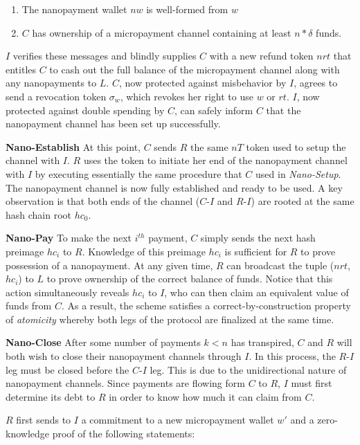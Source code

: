 \begin{enumerate}
\item The nanopayment wallet $nw$ is well-formed from $w$
\item $C$ has ownership of a micropayment channel containing at least $n *
  \delta$ funds.
\end{enumerate}

$I$ verifies these messages and blindly supplies $C$ with a new refund token
$nrt$ that entitles $C$ to cash out the full balance of the micropayment channel
along with any nanopayments to $L$. $C$, now protected against misbehavior by
$I$, agrees to send a revocation token $\sigma_w$, which revokes her right to
use $w$ or $rt$. $I$, now protected against double spending by $C$, can safely
inform $C$ that the nanopayment channel has been set up successfully.

\textbf{Nano-Establish} At this point, $C$ sends $R$ the same $nT$ token used to
setup the channel with $I$. $R$ uses the token to initiate her end of the
nanopayment channel with $I$ by executing essentially the same procedure that
$C$ used in \emph{Nano-Setup}. The nanopayment channel is now fully established and
ready to be used. A key observation is that both ends of the channel ($C$-$I$
and $R$-$I$) are rooted at the same hash chain root $hc_0$.

\textbf{Nano-Pay} To make the next $i^{th}$ payment, $C$ simply sends the next
hash preimage $hc_i$ to $R$. Knowledge of this preimage $hc_i$ is sufficient for
$R$ to prove possession of a nanopayment. At any given time, $R$ can broadcast
the tuple ($nrt$, $hc_i$) to $L$ to prove ownership of the correct balance of
funds. Notice that this action simultaneously reveals $hc_i$ to $I$, who can
then claim an equivalent value of funds from $C$. As a result, the
scheme satisfies a correct-by-construction property of \emph{atomicity}
whereby both legs of the protocol are finalized at the same time.

\textbf{Nano-Close} After some number of payments $k < n$ has transpired, $C$ and $R$ will both wish
to close their nanopayment channels through $I$. In this process, the $R$-$I$ leg
must be closed before the $C$-$I$ leg. This is due to the unidirectional nature
of nanopayment channels. Since payments are flowing form $C$ to $R$, $I$ must
first determine its debt to $R$ in order to know how much it can claim from $C$.

$R$ first sends to $I$ a commitment to a new micropayment wallet $w'$ and a
zero-knowledge proof of the following statements:

